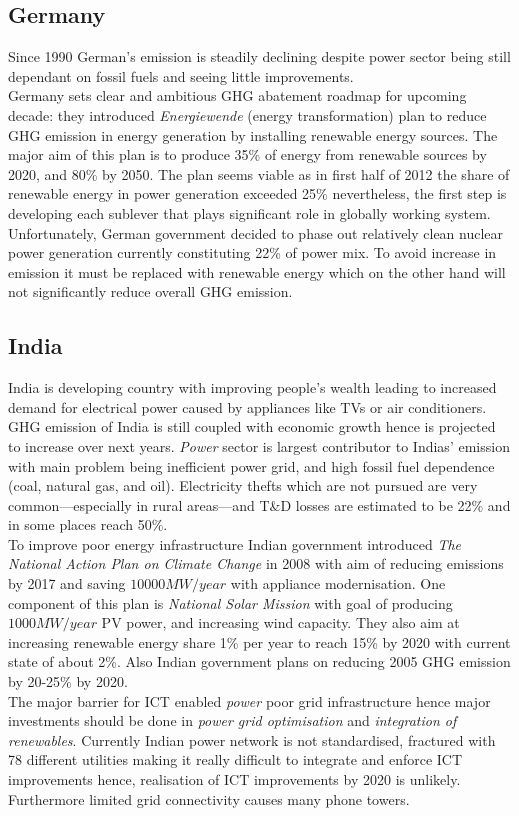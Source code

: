 \documentclass[11pt, twocolumn]{article}
\begin{document}
\subsection{Germany}
Since 1990 German's emission is steadily declining despite power sector being still dependant on fossil fuels and seeing little improvements.\\
Germany sets clear and ambitious GHG abatement roadmap for upcoming decade: they introduced \emph{Energiewende} (energy transformation) plan to reduce GHG emission in energy generation by installing renewable energy sources. The major aim of this plan is to produce 35\% of energy from renewable sources by 2020, and 80\% by 2050. The plan seems viable as in first half of 2012 the share of renewable energy in power generation exceeded 25\% nevertheless, the first step is developing each sublever that plays significant role in globally working system.\\
Unfortunately, German government decided to phase out relatively clean nuclear power generation currently constituting 22\% of power mix. To avoid increase in emission it must be replaced with renewable energy which on the other hand will not significantly reduce overall GHG emission.\\

\subsection{India}
India is developing country with improving people's wealth leading to increased demand for electrical power caused by appliances like TVs or air conditioners. GHG emission of India is still coupled with economic growth hence is projected to increase over next years. \emph{Power} sector is largest contributor to Indias' emission with main problem being inefficient power grid, and high fossil fuel dependence (coal, natural gas, and oil). Electricity thefts which are not pursued are very common---especially in rural areas---and T\&D losses are estimated to be 22\% and in some places reach 50\%.\\
To improve poor energy infrastructure Indian government introduced \emph{The National Action Plan on Climate Change} in 2008 with aim of reducing emissions by 2017 and saving $10000 MW/year$ with appliance modernisation. One component of this plan is \emph{National Solar Mission} with goal of producing $1000 MW/year$ PV power, and increasing wind capacity. They also aim at increasing renewable energy share 1\% per year to reach 15\% by 2020 with current state of about 2\%. Also Indian government plans on reducing 2005 GHG emission by 20-25\% by 2020.\\
The major barrier for ICT enabled \emph{power} poor grid infrastructure hence major investments should be done in \emph{power grid optimisation} and \emph{integration of renewables}. Currently Indian power network is not standardised, fractured with 78 different utilities making it really difficult to integrate and enforce ICT improvements hence, realisation of ICT improvements by 2020 is unlikely.\\
Furthermore limited grid connectivity causes many phone towers.
\end{document}
